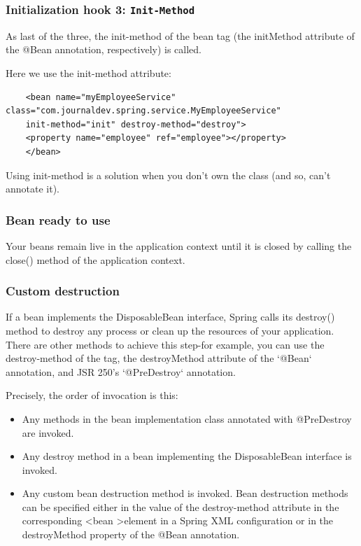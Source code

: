 \documentclass{scrartcl}
\begin{document}
\subsubsection{Initialization hook 3: \lstinline|Init-Method|}
As last of the three, the init-method of the bean tag (the initMethod attribute of the @Bean annotation, respectively) is called.

Here we use the init-method attribute:

\begin{lstlisting}
    <bean name="myEmployeeService" class="com.journaldev.spring.service.MyEmployeeService"
    init-method="init" destroy-method="destroy">
    <property name="employee" ref="employee"></property>
    </bean>
\end{lstlisting}

Using init-method is a solution when you don't own the class (and so, can't annotate it).

\subsubsection{Bean ready to use}
Your beans remain live in the application context until it is closed by calling the close() method of the application context.

\subsubsection{Custom destruction}
If a bean implements the DisposableBean interface, Spring calls its destroy() method to destroy any process or clean up the resources of your application. There are other methods to achieve this step-for example, you can use the destroy-method of the tag, the destroyMethod attribute of the `@Bean` annotation, and JSR 250's `@PreDestroy` annotation.

Precisely, the order of invocation is this:

\begin{itemize}
    \item Any methods in the bean implementation class annotated with @PreDestroy are invoked.
    \item Any destroy method in a bean implementing the DisposableBean interface is invoked.
    \item Any custom bean destruction method is invoked. Bean destruction methods can be specified either in the value of the destroy-method attribute in the corresponding \textless bean \textgreater element in a Spring XML configuration or in the destroyMethod property of the @Bean annotation.
\end{itemize}
\end{document}
